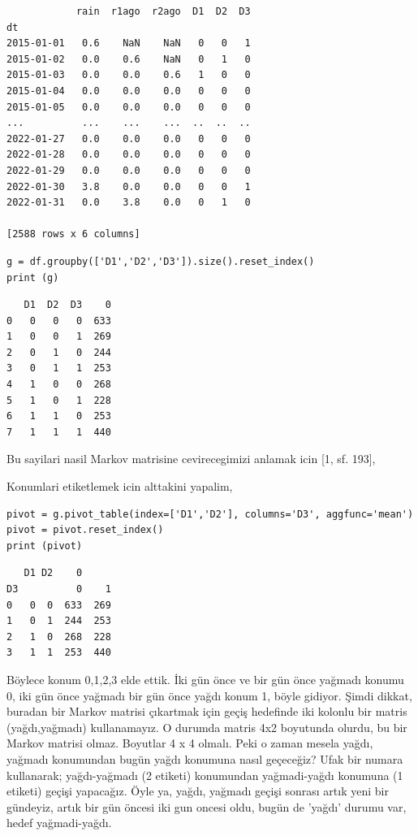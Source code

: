 \documentclass[12pt,fleqn]{article}\usepackage{../../common}
\begin{document}
\begin{verbatim}
            rain  r1ago  r2ago  D1  D2  D3
dt                                        
2015-01-01   0.6    NaN    NaN   0   0   1
2015-01-02   0.0    0.6    NaN   0   1   0
2015-01-03   0.0    0.0    0.6   1   0   0
2015-01-04   0.0    0.0    0.0   0   0   0
2015-01-05   0.0    0.0    0.0   0   0   0
...          ...    ...    ...  ..  ..  ..
2022-01-27   0.0    0.0    0.0   0   0   0
2022-01-28   0.0    0.0    0.0   0   0   0
2022-01-29   0.0    0.0    0.0   0   0   0
2022-01-30   3.8    0.0    0.0   0   0   1
2022-01-31   0.0    3.8    0.0   0   1   0

[2588 rows x 6 columns]
\end{verbatim}

\begin{verbatim}
g = df.groupby(['D1','D2','D3']).size().reset_index()
print (g)
\end{verbatim}

\begin{verbatim}
   D1  D2  D3    0
0   0   0   0  633
1   0   0   1  269
2   0   1   0  244
3   0   1   1  253
4   1   0   0  268
5   1   0   1  228
6   1   1   0  253
7   1   1   1  440
\end{verbatim}

Bu sayilari nasil Markov matrisine cevirecegimizi anlamak icin [1, sf. 193],

Konumlari etiketlemek icin alttakini yapalim,

\begin{verbatim}
pivot = g.pivot_table(index=['D1','D2'], columns='D3', aggfunc='mean')
pivot = pivot.reset_index()
print (pivot)
\end{verbatim}

\begin{verbatim}
   D1 D2    0     
D3          0    1
0   0  0  633  269
1   0  1  244  253
2   1  0  268  228
3   1  1  253  440
\end{verbatim}

Böylece konum 0,1,2,3 elde ettik. İki gün önce ve bir gün önce yağmadı konumu 0,
iki gün önce yağmadı bir gün önce yağdı konum 1, böyle gidiyor. Şimdi dikkat,
buradan bir Markov matrisi çıkartmak için geçiş hedefinde iki kolonlu bir matris
(yağdı,yağmadı) kullanamayız. O durumda matris 4x2 boyutunda olurdu, bu bir
Markov matrisi olmaz. Boyutlar 4 x 4 olmalı. Peki o zaman mesela yağdı, yağmadı
konumundan bugün yağdı konumuna nasıl geçeceğiz? Ufak bir numara kullanarak;
yağdı-yağmadı (2 etiketi) konumundan yağmadi-yağdı konumuna (1 etiketi) geçişi
yapacağız. Öyle ya, yağdı, yağmadı geçişi sonrası artık yeni bir gündeyiz, artık
bir gün öncesi iki gun oncesi oldu, bugün de 'yağdı' durumu var, hedef yağmadi-yağdı.
\end{document}
